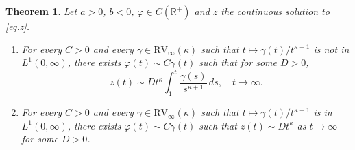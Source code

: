 \documentclass[a4paper,10pt,reqno]{amsart}
\numberwithin{equation}{section}
\newtheorem{theorem}{Theorem}
\theoremstyle{definition}
\theoremstyle{remark}
\DeclareMathOperator{\1}{\mathbbm 1}
\begin{document}
	\begin{theorem} \label{thm.growthbdssharp}
		Let $a>0$, $b<0$, $\varphi\in C(\mathbb{R}^+)$ and $z$ the continuous solution to \eqref{eq.z}.
		\begin{enumerate}
			\item[(a)] For every $C>0$ and every  $\gamma\in \text{RV}_\infty(\kappa)$ such that $t\mapsto \gamma(t)/t^{\kappa+1}$ is not in $L^1(0,\infty)$, there exists $\varphi(t)\sim C\gamma(t)$ such that for some $D>0$,
			\[
			z(t)\sim Dt^\kappa\int_1^t \frac{\gamma(s)}{s^{\kappa+1}}\,ds, \quad t\to\infty.
			\] 
			\item[(b)] For every $C>0$ and every  $\gamma\in \text{RV}_\infty(\kappa)$ such that $t\mapsto \gamma(t)/t^{\kappa+1}$ is in $L^1(0,\infty)$, there exists $\varphi(t)\sim C\gamma(t)$ such that $z(t)\sim Dt^\kappa$ as $t\to\infty$ 
			for some $D>0$.
		\end{enumerate}
	\end{theorem}  
\end{document}
